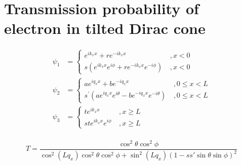     \section{Transmission probability of electron in tilted Dirac cone}
    \begin{align}
        \psi_1 &= 
        \begin{cases}
            e^{ik_xx} +re^{-ik_xx} \ &, x<0\\
            s(e^{ik_xx}e^{i\phi} +re^{-ik_xx}e^{-i\phi}) \ &, x < 0
        \end{cases}\\
        \psi_2 &=
        \begin{cases}
            ae^{iq_xx} +be^{-iq_xx} \ &, 0\leq x<L\\
            s^\prime(ae^{iq_xx}e^{i\theta} -be^{-iq_xx}e^{-i\theta} )\  &, 0\leq x<L
        \end{cases}\\
        \psi_3 &=
        \begin{cases}
            te^{ik_xx}\ & ,x\geq L\\
            ste^{ik_xx}e^{i\phi}\ & ,x\geq L
        \end{cases}\\
    \end{align}

    
    
    

    \begin{equation} \label{eq:tp}
        T=\frac{\cos^2 \theta \cos^2 \phi}{\cos^2 (L q_x) \cos^2 \theta \cos^2 \phi + \sin^2 (Lq_x)(1-ss'\sin \theta \sin \phi )^2}
    \end{equation}